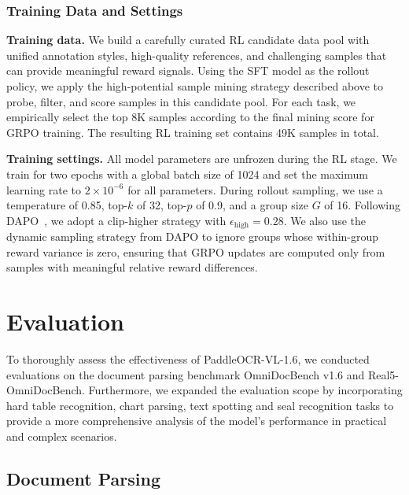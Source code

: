 \documentclass[11pt, a4paper,logo,  copyright, nonumbering]{paddleocr}
\begin{document}
\subsubsection{Training Data and Settings}

\noindent\hspace*{\parindent}\textbf{Training data.} We build a carefully curated RL candidate data pool with unified annotation styles, high-quality references, and challenging samples that can provide meaningful reward signals. Using the SFT model as the rollout policy, we apply the high-potential sample mining strategy described above to probe, filter, and score samples in this candidate pool. For each task, we empirically select the top 8K samples according to the final mining score for GRPO training. The resulting RL training set contains 49K samples in total.

\noindent\hspace*{\parindent}\textbf{Training settings.} All model parameters are unfrozen during the RL stage. We train for two epochs with a global batch size of 1024 and set the maximum learning rate to $2\times10^{-6}$ for all parameters. During rollout sampling, we use a temperature of 0.85, top-$k$ of 32, top-$p$ of 0.9, and a group size $G$ of 16. Following DAPO~\cite{yu2026dapo}, we adopt a clip-higher strategy with $\epsilon_{\mathrm{high}}=0.28$. We also use the dynamic sampling strategy from DAPO to ignore groups whose within-group reward variance is zero, ensuring that GRPO updates are computed only from samples with meaningful relative reward differences.


\section{Evaluation}

\label{sec:experiments} 

To thoroughly assess the effectiveness of PaddleOCR-VL-1.6, we conducted evaluations on the document parsing benchmark OmniDocBench v1.6\cite{MinerU25Pro} and Real5-OmniDocBench\cite{zhou2026real5omnidocbenchfullscalephysicalreconstruction}. Furthermore, we expanded the evaluation scope by incorporating hard table recognition, chart parsing, text spotting and seal recognition tasks to provide a more comprehensive analysis of the model's performance in practical and complex scenarios.


\subsection{Document Parsing}
\label{Document Parsing}
\end{document}
